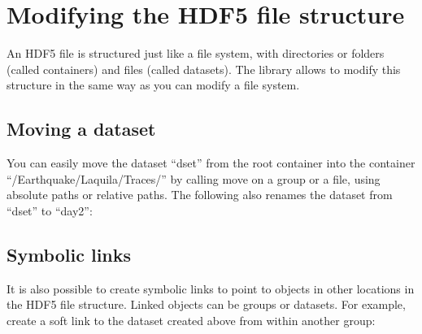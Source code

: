 \documentclass[letterpaper,10pt,english]{sphinxmanual}
\begin{document}
\chapter{Modifying the HDF5 file structure}
\label{\detokenize{index:modifying-the-hdf5-file-structure}}
\sphinxAtStartPar
An HDF5 file is structured just like a file system, with directories or folders (called containers) and files (called datasets).
The library allows to modify this structure in the same way as you can modify a file system.


\section{Moving a dataset}
\label{\detokenize{index:moving-a-dataset}}
\sphinxAtStartPar
You can easily move the dataset “dset” from the root container into the container “/Earthquake/Laquila/Traces/” by calling move on a group or a file, using absolute paths or relative paths.
The following also renames the dataset from “dset” to “day2”:

\begin{sphinxVerbatim}[commandchars=\\\{\}]
  
 

  \PYG{p}{[}\PYG{p}{]}
 
\end{sphinxVerbatim}


\section{Symbolic links}
\label{\detokenize{index:symbolic-links}}
\sphinxAtStartPar
It is also possible to create symbolic links to point to objects in other locations in the HDF5 file structure.
Linked objects can be groups or datasets.
For example, create a soft link to the dataset created above from within another group:

\begin{sphinxVerbatim}[commandchars=\\\{\}]
\PYG{p}{[}\PYG{p}{]}  
\end{sphinxVerbatim}
\end{document}
